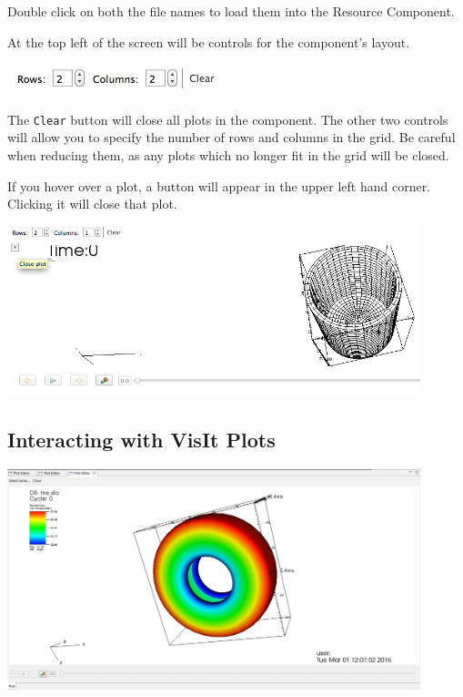 Double click on both the file names to load them into the Resource Component.

At the top left of the screen will be controls for the component's layout.

\begin{center}
\includegraphics{images/ResourceComponentControls}
\end{center}

The \texttt{Clear} button will close all plots in the component. The other two
controls will allow you to specify the number of rows and columns in the grid.
Be careful when reducing them, as any plots which no longer fit in the grid will
be closed.

If you hover over a plot, a button will appear in the upper left hand corner.
Clicking it will close that plot. 

\begin{center}
\includegraphics[width=12cm]{images/ClosePlotButton}
\end{center}

\subsection{Interacting with VisIt Plots}

\begin{center}
\includegraphics[width=12cm]{images/VisItPlot}
\end{center}

